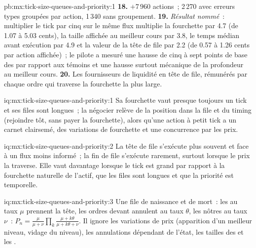 \begin{solution}{pb:mx:tick-size-queues-and-priority:1}
\textbf{18.} $+7\,960$ actions~; 2\,270 avec erreurs types groupées par action, 1\,340 sans groupement.
\textbf{19.} \emph{Résultat nommé}~: multiplier le tick par cinq sur le même flux multiplie la fourchette par 4.7 (de 1.07 à 5.03 cents), la taille affichée au
meilleur cours par 3.8, le temps médian avant exécution par 4.9 et la valeur de la tête de file par 2.2 (de 0.57 à 1.26 cents par action affichée)~; le pilote a mesuré une
hausse de cinq à sept points de base des  par rapport aux témoins et une hausse surtout mécanique de la profondeur au meilleur cours.
\textbf{20.} Les fournisseurs de liquidité en tête de file, rémunérés par chaque ordre qui traverse la fourchette la plus large.
\end{solution}

\begin{solution}{iq:mx:tick-size-queues-and-priority:1}
Sa fourchette vaut presque toujours un tick et ses files sont longues~; la négocier relève de la position dans la file et du timing (rejoindre tôt, sans payer la
fourchette), alors qu'une action à petit tick a un carnet clairsemé, des variations de fourchette et une concurrence par les prix.
\end{solution}

\begin{solution}{iq:mx:tick-size-queues-and-priority:2}
La tête de file s'exécute plus souvent et face à un flux moins informé~; la fin de file s'exécute rarement, surtout lorsque le prix la traverse. Elle vaut davantage lorsque le
tick est grand par rapport à la fourchette naturelle de l'actif, que les files sont longues et que la priorité est temporelle.
\end{solution}

\begin{solution}{iq:mx:tick-size-queues-and-priority:3}
Une file de naissance et de mort~: les  au taux $\mu$ prennent la tête, les ordres devant annulent au taux $\theta$, les nôtres au taux $\nu$~: $P_n=\tfrac{\mu}{\mu+\nu}\prod_k\tfrac{\mu+k
\theta}{\mu+k\theta+\nu}$. Il ignore les variations de prix (apparition d'un meilleur niveau, vidage du niveau), les annulations dépendant de l'état, les tailles des  et les
.
\end{solution}

